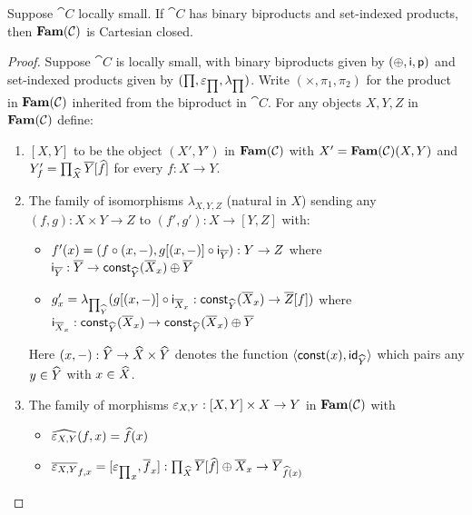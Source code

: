 \begin{proposition}
Suppose $\cat{C}$ locally small. If $\cat{C}$ has binary biproducts and set-indexed products, then
$\mathbf{Fam}(\mathcal{C})$ is Cartesian closed.
\end{proposition}

\begin{proof}
Suppose $\cat{C}$ is locally small, with binary biproducts given by $(\oplus,\mathsf{i},\mathsf{p})$ and set-indexed
products given by $(\prod,\varepsilon_{\prod},\lambda_{\prod})$. Write $(\times,\pi_1,\pi_2)$ for the product in
$\mathbf{Fam}(\mathcal{C})$ inherited from the biproduct in $\cat{C}$. For any objects $X, Y, Z$ in $\mathbf{Fam}(\mathcal{C})$
define:

\begin{enumerate}
\item $[X, Y]$ to be the object $(X',Y')$ in $\mathbf{Fam}(\mathcal{C})$ with $X' = \mathbf{Fam}(\mathcal{C})(X,Y)$ and $Y'_f =
\prod_{\widehat{X}}\overline{Y}[\widehat{f}]$ for every $f: X \to Y$.
\item The family of isomorphisms $\lambda_{X,Y,Z}$ (natural in $X$) sending any $(f, g): X \times Y \to Z$ to
$(f', g'): X \to [Y, Z]$ with:
\begin{itemize}
\item $f'(x) = (f \circ (x, -), g[(x,-)] \circ \mathsf{i}_{\overline{Y}}):
Y \to Z$ where $\mathsf{i}_{\overline{Y}}: \overline{Y} \to \mathsf{const}_{\widehat{Y}}(\overline{X}_x) \oplus \overline{Y}$
\item $g'_x = \lambda_{\prod_{\widehat{Y}}}(g[(x,-)] \circ \mathsf{i}_{\overline{X}_x}:
\mathsf{const}_{\widehat{Y}}(\overline{X}_x) \to \overline{Z}[f])$ where $\mathsf{i}_{\overline{X}_x}: \mathsf{const}_{\widehat{Y}}(\overline{X}_x)
\to \mathsf{const}_{\widehat{Y}}(\overline{X}_x) \oplus \overline{Y}$
\end{itemize}
Here $(x,-): \widehat{Y} \to \widehat{X} \times \widehat{Y}$ denotes the function $\langle \mathsf{const}(x), \mathsf{id}_{\widehat{Y}}\rangle$ which
pairs any $y \in \widehat{Y}$ with $x \in \widehat{X}$.
\item The family of morphisms $\varepsilon_{X,Y}: [X, Y] \times X \to Y$ in $\mathbf{Fam}(\mathcal{C})$ with
\begin{itemize}
\item $\widehat{\varepsilon_{X,Y}}(f, x) = \widehat{f}(x)$
\item $\overline{\varepsilon_{X,Y}}_{f, x} = [{\varepsilon_{\prod}}_x, \overline{f}_x]:
\prod_{\widehat{X}}\overline{Y}[\widehat{f}] \oplus \overline{X}_x \to \overline{Y}_{\widehat{f}(x)}$
\end{itemize}
\end{enumerate}


\end{proof}
